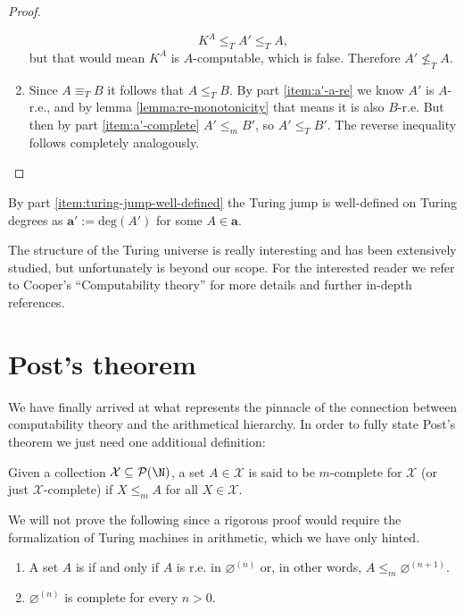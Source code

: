 \documentclass[../main.tex]{memoir}
\begin{document}
\begin{proof}
\begin{enumerate}
    \[ K^A \le_T A' \le_T A, \]
    but that would mean $K^A$ is $A$-computable, which is false. Therefore $A' \not\le_T A$.
  \item Since $A \equiv_T B$ it follows that $A \le_T B$. By part \ref{item:a'-a-re} we know $A'$ is $A$-r.e., and by lemma \ref{lemma:re-monotonicity} that means it is also $B$-r.e. But then by part \ref{item:a'-complete} $A' \le_m B'$, so $A' \le_T B'$. The reverse inequality follows completely analogously.
  \end{enumerate}
\end{proof}

\begin{corollary}
  By part \ref{item:turing-jump-well-defined} the Turing jump is well-defined on Turing degrees as $\mathbf{a}' := \text{deg}(A')$ for some $A \in \mathbf{a}$.
\end{corollary}

The structure of the Turing universe is really interesting and has been extensively studied, but unfortunately is beyond our scope. For the interested reader we refer to Cooper's ``Computability theory'' \cite{cooper} for more details and further in-depth references.

\section{Post's theorem}

We have finally arrived at what represents the pinnacle of the connection between computability theory and the arithmetical hierarchy. In order to fully state Post's theorem we just need one additional definition:

\begin{definition}[$m$-completeness]
  Given a collection $\mathcal{X} \subseteq \mathcal{P}(\N)$, a set $A \in \mathcal{X}$ is said to be $m$-complete for $\mathcal{X}$ (or just $\mathcal{X}$-complete) if $X \le_m A$ for all $X \in \mathcal{X}$.
\end{definition}

We will not prove the following since a rigorous proof would require the formalization of Turing machines in arithmetic, which we have only hinted.

\begin{theorem}
  \begin{enumerate}
  \item A set $A$ is  if and only if $A$ is r.e. in $\varnothing^{(n)}$ or, in other words, $A \le_m \varnothing^{(n + 1)}$.
  \item $\varnothing^{(n)}$ is  complete for every $n > 0$.
  \end{enumerate}
\end{theorem}
\end{document}
